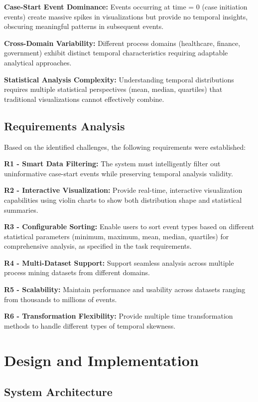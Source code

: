 \documentclass[11pt,a4paper]{article}
\begin{document}
\textbf{Case-Start Event Dominance:} Events occurring at time = 0 (case initiation events) create massive spikes in visualizations but provide no temporal insights, obscuring meaningful patterns in subsequent events.

\textbf{Cross-Domain Variability:} Different process domains (healthcare, finance, government) exhibit distinct temporal characteristics requiring adaptable analytical approaches.

\textbf{Statistical Analysis Complexity:} Understanding temporal distributions requires multiple statistical perspectives (mean, median, quartiles) that traditional visualizations cannot effectively combine.

\subsection{Requirements Analysis}

Based on the identified challenges, the following requirements were established:

\textbf{R1 - Smart Data Filtering:} The system must intelligently filter out uninformative case-start events while preserving temporal analysis validity.

\textbf{R2 - Interactive Visualization:} Provide real-time, interactive visualization capabilities using violin charts to show both distribution shape and statistical summaries.

\textbf{R3 - Configurable Sorting:} Enable users to sort event types based on different statistical parameters (minimum, maximum, mean, median, quartiles) for comprehensive analysis, as specified in the task requirements.

\textbf{R4 - Multi-Dataset Support:} Support seamless analysis across multiple process mining datasets from different domains.

\textbf{R5 - Scalability:} Maintain performance and usability across datasets ranging from thousands to millions of events.

\textbf{R6 - Transformation Flexibility:} Provide multiple time transformation methods to handle different types of temporal skewness.

\section{Design and Implementation}
\label{sec:design}

\subsection{System Architecture}
\end{document}
